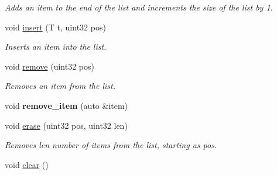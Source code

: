 \begin{DoxyCompactItemize}
\begin{DoxyCompactList}\small\item\em Adds an item to the end of the list and increments the size of the list by 1. \end{DoxyCompactList}\item 
void \hyperlink{classetk_1_1_list_a95d6852055e5669632da51c6aa60e949}{insert} (T t, uint32 pos)
\begin{DoxyCompactList}\small\item\em Inserts an item into the list. \end{DoxyCompactList}\item 
void \hyperlink{classetk_1_1_list_a720fec604f6c57135b6796167171756a}{remove} (uint32 pos)
\begin{DoxyCompactList}\small\item\em Removes an item from the list. \end{DoxyCompactList}\item 
\hypertarget{classetk_1_1_list_a2b922183cf60d1bf3c351af927cfe51d}{void {\bfseries remove\-\_\-item} (auto \&item)}\label{classetk_1_1_list_a2b922183cf60d1bf3c351af927cfe51d}

\item 
void \hyperlink{classetk_1_1_list_a1e3a92350967e1fabcda37bbef21b796}{erase} (uint32 pos, uint32 len)
\begin{DoxyCompactList}\small\item\em Removes len number of items from the list, starting as pos. \end{DoxyCompactList}\item 
\hypertarget{classetk_1_1_list_a429128ca6b0d5f9e97fdfd52b0190364}{void \hyperlink{classetk_1_1_list_a429128ca6b0d5f9e97fdfd52b0190364}{clear} ()}\label{classetk_1_1_list_a429128ca6b0d5f9e97fdfd52b0190364}


\end{DoxyCompactItemize}
